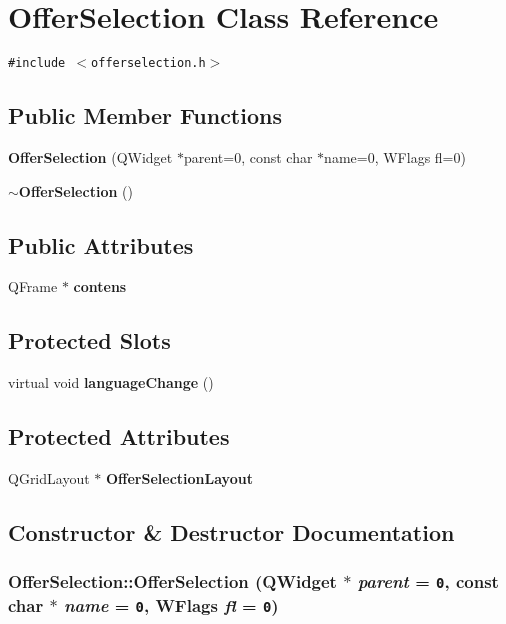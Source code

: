 \section{Offer\-Selection Class Reference}
\label{classOfferSelection}
{\tt \#include $<$offerselection.h$>$}

\subsection*{Public Member Functions}
\begin{CompactItemize}
\item 
{\bf Offer\-Selection} (QWidget $\ast$parent=0, const char $\ast$name=0, WFlags fl=0)
\item 
{\bf $\sim$Offer\-Selection} ()
\end{CompactItemize}
\subsection*{Public Attributes}
\begin{CompactItemize}
\item 
QFrame $\ast$ {\bf contens}
\end{CompactItemize}
\subsection*{Protected Slots}
\begin{CompactItemize}
\item 
virtual void {\bf language\-Change} ()
\end{CompactItemize}
\subsection*{Protected Attributes}
\begin{CompactItemize}
\item 
QGrid\-Layout $\ast$ {\bf Offer\-Selection\-Layout}
\end{CompactItemize}


\subsection{Constructor \& Destructor Documentation}
\subsubsection{\setlength{\rightskip}{0pt plus 5cm}Offer\-Selection::Offer\-Selection (QWidget $\ast$ {\em parent} = {\tt 0}, const char $\ast$ {\em name} = {\tt 0}, WFlags {\em fl} = {\tt 0})}\label{classOfferSelection_5550c0fd7cedfbc6a03fcff4fa04f39e}


